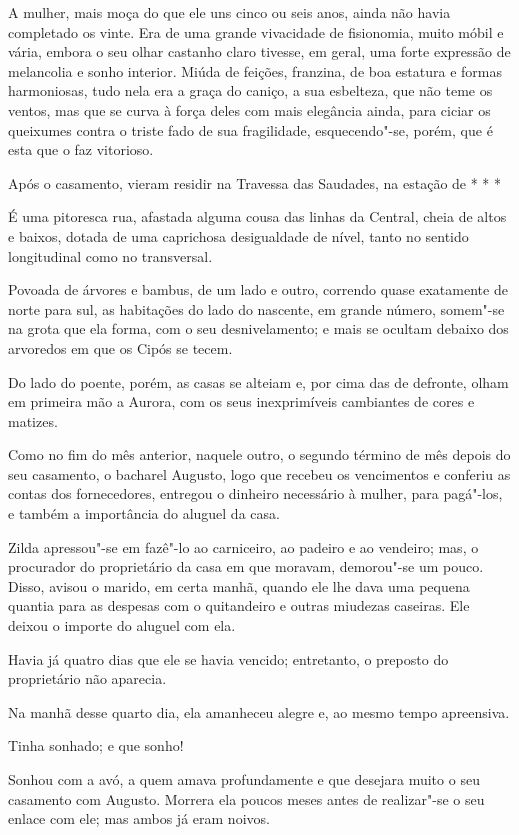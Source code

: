 A mulher, mais moça do que ele uns cinco ou seis anos, ainda não havia
completado os vinte. Era de uma grande vivacidade de fisionomia, muito
móbil e vária, embora o seu olhar castanho claro tivesse, em geral, uma
forte expressão de melancolia e sonho interior. Miúda de feições,
franzina, de boa estatura e formas harmoniosas, tudo nela era a graça do
caniço, a sua esbelteza, que não teme os ventos, mas que se curva à
força deles com mais elegância ainda, para ciciar os queixumes contra o
triste fado de sua fragilidade, esquecendo"-se, porém, que é esta que o
faz vitorioso.

Após o casamento, vieram residir na Travessa das Saudades, na estação de
* * *

É uma pitoresca rua, afastada alguma cousa das linhas da Central, cheia
de altos e baixos, dotada de uma caprichosa desigualdade de nível, tanto
no sentido longitudinal como no transversal.

Povoada de árvores e bambus, de um lado e outro, correndo quase
exatamente de norte para sul, as habitações do lado do nascente, em
grande número, somem"-se na grota que ela forma, com o seu
desnivelamento; e mais se ocultam debaixo dos arvoredos em que os Cipós
se tecem.

Do lado do poente, porém, as casas se alteiam e, por cima das de
defronte, olham em primeira mão a Aurora, com os seus inexprimíveis
cambiantes de cores e matizes.

Como no fim do mês anterior, naquele outro, o segundo término de mês
depois do seu casamento, o bacharel Augusto, logo que recebeu os
vencimentos e conferiu as contas dos fornecedores, entregou o dinheiro
necessário à mulher, para pagá"-los, e também a importância do aluguel da
casa.

Zilda apressou"-se em fazê"-lo ao carniceiro, ao padeiro e ao vendeiro;
mas, o procurador do proprietário da casa em que moravam, demorou"-se um
pouco. Disso, avisou o marido, em certa manhã, quando ele lhe dava uma
pequena quantia para as despesas com o quitandeiro e outras miudezas
caseiras. Ele deixou o importe do aluguel com ela.

Havia já quatro dias que ele se havia vencido; entretanto, o preposto do
proprietário não aparecia.

Na manhã desse quarto dia, ela amanheceu alegre e, ao mesmo tempo
apreensiva.

Tinha sonhado; e que sonho!

Sonhou com a avó, a quem amava profundamente e que desejara muito o seu
casamento com Augusto. Morrera ela poucos meses antes de realizar"-se o
seu enlace com ele; mas ambos já eram noivos.

